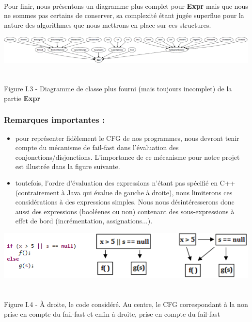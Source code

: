 \documentclass{report}
\begin{document}
\paragraph{}
\hspace{4mm}\textnormal{Pour finir, nous pr\'{e}sentons un diagramme plus complet pour \textbf{Expr} mais que nous ne sommes pas certains de conserver, sa complexit\'{e} \'{e}tant jug\'{e}e 
superflue pour la nature des algorithmes que nous mettrons en place sur ces structures.}

\begin{center}
\includegraphics[scale=0.5]{data/expr2.png}
~\\~\\Figure I.3 - Diagramme de classe plus fourni (mais toujours incomplet) de la partie \textbf{Expr}
\end{center}

\subsubsection{Remarques importantes :}

\vspace{4mm}
\begin{itemize}
\item pour repr\'{e}senter fid\`{e}lement le CFG de nos programmes, nous devront tenir compte du m\'{e}canisme de fail-fast dans l'\'{e}valuation des conjonctions/disjonctions.
L'importance de ce m\'{e}canisme pour notre projet est illustr\'{e}e dans la figure suivante.\vspace{1mm}
\item toutefois, l'ordre d'\'{e}valuation des expressions n'\'{e}tant pas sp\'{e}cifi\'{e} en C++ (contrairement \`{a} Java qui \'{e}value de gauche \`{a} droite), nous limiterons ces consid\'{e}rations \`{a} des expressions simples. Nous nous d\'{e}sint\'{e}resserons donc aussi
des expressions (bool\'{e}enes ou non) contenant des sous-expressions \`{a} effet de bord (incr\'{e}mentation, assignations...).\vspace{1mm}
\end{itemize}

\begin{center}
\includegraphics[scale=0.85]{data/fail-fast.png}
~\\~\\Figure I.4 - \`{A} droite, le code consid\'{e}r\'{e}. Au centre, le CFG correspondant \`{a} la non prise en compte du fail-fast et enfin \`{a} droite, prise en compte du fail-fast
\end{center}
\end{document}
